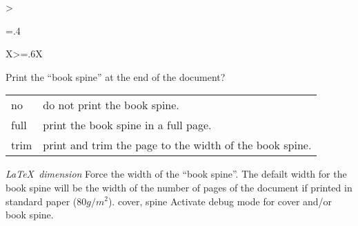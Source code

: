 \begin{xltabular}{\linewidth}{>{\hsize=.4\hsize\raggedright\arraybackslash}X>{\hsize=.6\hsize}X}
    {Print the “book spine” at the end of the document?}%
	{%
	    \begin{tabular}{@{}l@{ $\rightarrow$ }X@{}}
		no 		& do not print the book spine.\\
		full	& print the book spine in a full page.\\
		trim 	& print and trim the page to the width of the book spine.\\
	    \end{tabular}
    }
    \midrule
    {\emph{\LaTeX\ dimension}}%
    {Force the width of the “book spine”.}%
	{%
		 The defailt width for the book spine will be the width of the number of pages of the document if printed in standard paper ($80g/m^2$).
    }
    \midrule
    {cover, spine}%
    {Activate debug mode for cover and/or book spine.}%
	{%
    }
%
%
%
%

\end{xltabular}
